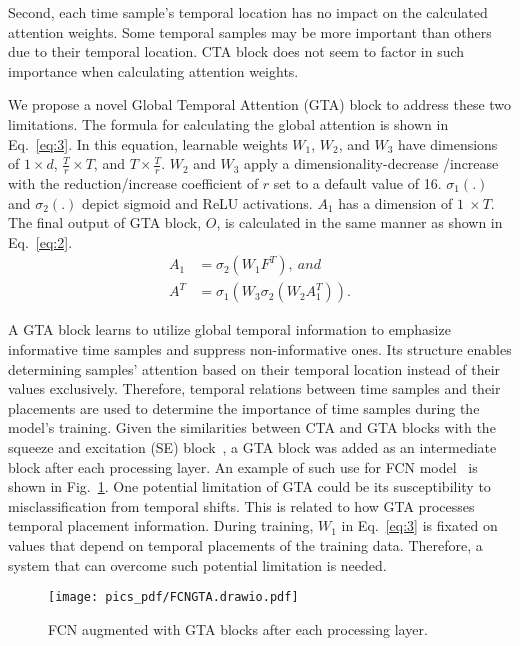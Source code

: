\documentclass[journal]{IEEEtran}
\begin{document}
Second, each time sample's temporal location has no impact on the calculated attention weights. Some temporal samples may be more important than others due to their temporal location. CTA block does not seem to factor in such importance when calculating attention weights. 

We propose a novel Global Temporal Attention (GTA) block to address these two limitations. The formula for calculating the global attention is shown in Eq.~\eqref{eq:3}. In this equation, learnable weights $W_1$, $W_2$, and $W_3$ have dimensions of $1\times d$, $ \frac{T}{r}\times T$, and $T\times\frac{T}{r}$. $W_2$ and $W_3$ apply a dimensionality-decrease /increase with the reduction/increase coefficient of $r$ set to a default value of 16. $ \sigma_1\left(.\right)$ and $ \sigma_2\left(.\right)$ depict sigmoid and ReLU activations. $A_1$ has a dimension of $1\ \times T$. The final output of GTA block, $ O $, is calculated in the same manner as shown in Eq.~\eqref{eq:2}.
\begin{equation} \label{eq:3}
\begin{split}
A_1 &=\sigma_2\left(W_1F^T\right),\: and\\
A^T &=\sigma_1\left(W_3\sigma_2\left(W_2A_1^T\right)\right).
\end{split}
\end{equation}

A GTA block learns to utilize global temporal information to emphasize informative time samples and suppress non-informative ones. Its structure enables determining samples' attention based on their temporal location instead of their values exclusively. Therefore, temporal relations between time samples and their placements are used to determine the importance of time samples during the model's training. Given the similarities between CTA and GTA blocks with the squeeze and excitation (SE) block~\cite{hu2018squeeze}, a GTA block was added as an intermediate block after each processing layer. An example of such use for FCN model~\cite{wang2017time} is shown in Fig.~\ref{fig:fcngta}. One potential limitation of GTA could be its susceptibility to misclassification from temporal shifts. This is related to how GTA processes temporal placement information. During training, $W_1$ in Eq.~\eqref{eq:3} is fixated on values that depend on temporal placements of the training data. Therefore, a system that can overcome such potential limitation is needed.
\begin{figure}[!t]
\centering
\texttt{[image: pics\_pdf/FCNGTA.drawio.pdf]}
\caption{FCN augmented with GTA blocks after each processing layer. }
\label{fig:fcngta}
\end{figure}
\end{document}
